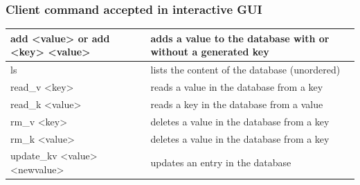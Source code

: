 \documentclass[a4paper,11pt]{report}
\begin{document}
\begin{centering}
        \subsubsection*{Client command accepted in interactive GUI}
        \begin{tabular}{|m{7cm}|m{8cm}|}
            \hline
            add <value> or add <key> <value> & adds a value to the database with or without a generated key \\
            \hline
            ls & lists the content of the database (unordered) \\
            \hline
            read\_v <key> & reads a value in the database from a key \\
            \hline
            read\_k <value> & reads a key in the database from a value \\
            \hline
            rm\_v <key> & deletes a value in the database from a key \\
            \hline
            rm\_k <value> & deletes a value in the database from a key \\
            \hline
            update\_kv <value> <newvalue> & updates an entry in the database \\
            \hline
        \end{tabular}
    \end{centering}
\end{document}
